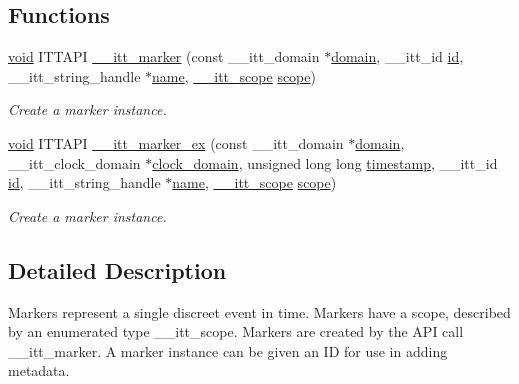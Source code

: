 \subsection*{Functions}
\begin{DoxyCompactItemize}
\item 
\hyperlink{ittnotify__static_8h_af941d56e55e3c5465135b60c4d6343ed}{void} I\-T\-T\-A\-P\-I \hyperlink{group__markers_gaf5bb17e236d525fa8a84d66d62259503}{\-\_\-\-\_\-itt\-\_\-marker} (const \-\_\-\-\_\-itt\-\_\-domain $\ast$\hyperlink{ittnotify__static_8h_ae4bc3459cfd348603d57d87ede15591b}{domain}, \-\_\-\-\_\-itt\-\_\-id \hyperlink{ittnotify__static_8h_a9ebeaf6e841ab2e3ed2f92a8850e0c3d}{id}, \-\_\-\-\_\-itt\-\_\-string\-\_\-handle $\ast$\hyperlink{ittnotify__static_8h_a1c34b35a4952969fef60192313bba34a}{name}, \hyperlink{group__markers_ga9712c6a992a435d4d134e7164f609f04}{\-\_\-\-\_\-itt\-\_\-scope} \hyperlink{ittnotify__static_8h_a0fd38e6d524143379caa686304561d5b}{scope})
\begin{DoxyCompactList}\small\item\em Create a marker instance. \end{DoxyCompactList}\item 
\hyperlink{ittnotify__static_8h_af941d56e55e3c5465135b60c4d6343ed}{void} I\-T\-T\-A\-P\-I \hyperlink{group__markers_gad4d64549f975be3321d5bf6e7666311e}{\-\_\-\-\_\-itt\-\_\-marker\-\_\-ex} (const \-\_\-\-\_\-itt\-\_\-domain $\ast$\hyperlink{ittnotify__static_8h_ae4bc3459cfd348603d57d87ede15591b}{domain}, \-\_\-\-\_\-itt\-\_\-clock\-\_\-domain $\ast$\hyperlink{ittnotify__static_8h_ae1bcb4e98ad481802f2e81e3011d2b88}{clock\-\_\-domain}, unsigned long long \hyperlink{ittnotify__static_8h_a7f70deb13f0edd71fe66beafff3276d2}{timestamp}, \-\_\-\-\_\-itt\-\_\-id \hyperlink{ittnotify__static_8h_a9ebeaf6e841ab2e3ed2f92a8850e0c3d}{id}, \-\_\-\-\_\-itt\-\_\-string\-\_\-handle $\ast$\hyperlink{ittnotify__static_8h_a1c34b35a4952969fef60192313bba34a}{name}, \hyperlink{group__markers_ga9712c6a992a435d4d134e7164f609f04}{\-\_\-\-\_\-itt\-\_\-scope} \hyperlink{ittnotify__static_8h_a0fd38e6d524143379caa686304561d5b}{scope})
\begin{DoxyCompactList}\small\item\em Create a marker instance. \end{DoxyCompactList}\end{DoxyCompactItemize}


\subsection{Detailed Description}
Markers represent a single discreet event in time. Markers have a scope, described by an enumerated type \-\_\-\-\_\-itt\-\_\-scope. Markers are created by the A\-P\-I call \-\_\-\-\_\-itt\-\_\-marker. A marker instance can be given an I\-D for use in adding metadata. 

